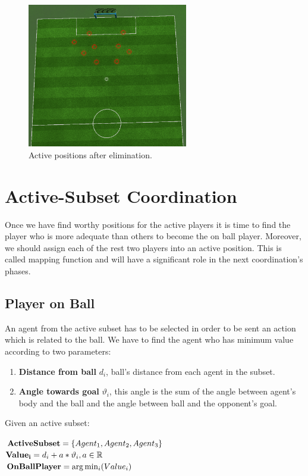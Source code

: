 \begin{figure}[t!]
\centering
  \includegraphics[width=7cm]{Chapter4/figures/Active3.png}
  \caption{Active positions after elimination.} 
  \label{fig:ActivePositions3}
\end{figure}


\section{Active-Subset Coordination}
Once we have find worthy positions for the active players it is time to find the player who is more adequate than others to become the on ball player. Moreover, we should assign each of the rest two players into an active position. This is called mapping function and will have a significant role in the next coordination's phases. 
\subsection{Player on Ball}
An agent from the active subset has to be selected in order to be sent an action which is related to the ball. We have to find the agent who has minimum value according to two parameters:
\begin{enumerate}
\item \textbf{Distance from ball} $d_{i}$, ball's distance from each agent in the subset. 
\item \textbf{Angle towards goal} $\vartheta_{i}$, this angle is the sum of  the angle between agent's body and the ball and the angle between ball and the opponent's goal.
\end{enumerate}
Given an active subset:
\begin{center}
${\bf ActiveSubset} = \lbrace Agent_{1},Agent_{2},Agent_{3} \rbrace $\\
${\bf Value_{i}} = d_{i} + a \ast \vartheta_{i}, a\in\mathbb{R}$\\
${\bf OnBallPlayer} = \arg\min_{i}(Value_{i}) $\\
\end{center}

